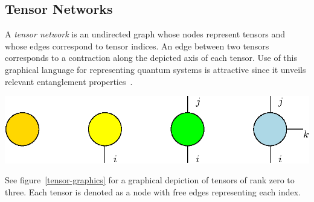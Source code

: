 \documentclass[12pt]{article}
\newenvironment{Figure}
  {\par\medskip\noindent\minipage{\linewidth}}
  {\endminipage\par\medskip}
\begin{document}
\begin{multicols}{2}
	\subsection*{Tensor Networks}
	A \textit{tensor network} is an undirected graph whose nodes
	represent tensors and whose edges correspond to tensor indices. An
	edge between two tensors corresponds to a contraction along the
	depicted axis of each tensor. Use of this graphical language for
	representing quantum systems is attractive since it unveils relevant
	entanglement properties~\cite{TnIntro}.
	\begin{Figure}
		\center\includegraphics[width=.9\textwidth]{./Figures/tensors.eps}
		\label{tensor-graphics}
	\end{Figure}
	See figure~\ref{tensor-graphics} for a graphical depiction of
	tensors of rank zero to three. Each tensor is denoted as a node with
	free edges representing each index.


\end{multicols}
\end{document}
